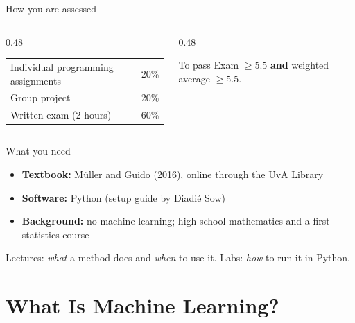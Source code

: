 \documentclass[handout,aspectratio=169,t,9pt]{beamer}
\begin{document}
\begin{frame}{How you are assessed}
  \begin{columns}[T,onlytextwidth]
    \begin{column}{0.48\textwidth}
      \begin{tabular}{@{}lr@{}}
        \toprule
        Individual programming assignments & 20\% \\
        Group project                      & 20\% \\
        Written exam (2 hours)             & 60\% \\
        \bottomrule
      \end{tabular}
    \end{column}
    \begin{column}{0.48\textwidth}
      \begin{keypoint}{To pass}
        Exam $\ge 5.5$ \textbf{and} weighted average $\ge 5.5$.
      \end{keypoint}
    \end{column}
  \end{columns}

  \vfill
\end{frame}

\begin{frame}{What you need}
  \begin{itemize}
    \item \textbf{Textbook:} M\"{u}ller and Guido (2016), online through the
          UvA Library
    \item \textbf{Software:} Python (setup guide by Diadi\'{e} Sow)
    \item \textbf{Background:} no machine learning; high-school mathematics
          and a first statistics course
  \end{itemize}

  \vfill
  \begin{takeaway}
    Lectures: \emph{what} a method does and \emph{when} to use it.
    Labs: \emph{how} to run it in Python.
  \end{takeaway}

\end{frame}

\section{What Is Machine Learning?}
\end{document}
